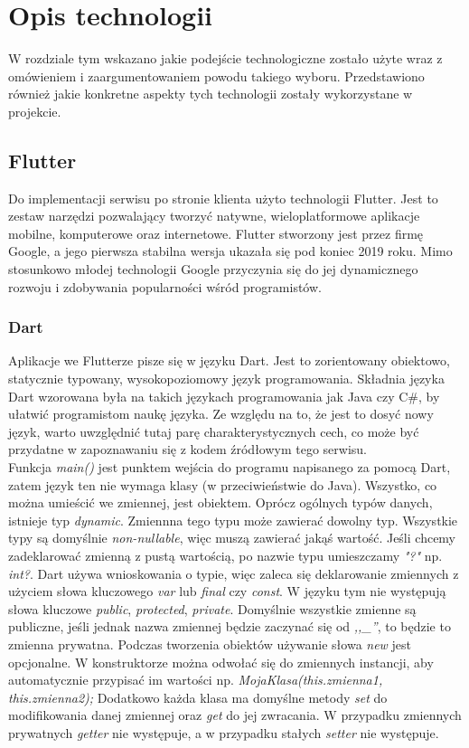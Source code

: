\chapter{Opis technologii}
\thispagestyle{chapterBeginStyle}

W rozdziale tym wskazano jakie podejście technologiczne zostało użyte wraz z omówieniem i zaargumentowaniem powodu takiego wyboru. Przedstawiono również jakie konkretne aspekty tych technologii zostały wykorzystane w projekcie.

\section{Flutter}

Do implementacji serwisu po stronie klienta użyto technologii Flutter. Jest to zestaw narzędzi pozwalający tworzyć natywne, wieloplatformowe aplikacje mobilne, komputerowe oraz internetowe. Flutter stworzony jest przez firmę Google, a jego pierwsza stabilna wersja ukazała się pod koniec 2019 roku. Mimo stosunkowo młodej technologii Google przyczynia się do jej dynamicznego rozwoju i zdobywania popularności wśród programistów. 

\subsection{Dart}

Aplikacje we Flutterze pisze się w języku Dart. Jest to zorientowany obiektowo, statycznie typowany, wysokopoziomowy język programowania. Składnia języka Dart wzorowana była na takich językach programowania jak Java czy C\#, by ułatwić programistom naukę języka. Ze względu na to, że jest to dosyć nowy język, warto uwzględnić tutaj parę charakterystycznych cech, co może być przydatne w zapoznawaniu się z kodem źródłowym tego serwisu. \\

Funkcja \emph{main()} jest punktem wejścia do programu napisanego za pomocą Dart, zatem język ten nie wymaga klasy (w przeciwieństwie do Java). Wszystko, co można umieścić we zmiennej, jest obiektem. Oprócz ogólnych typów danych, istnieje typ \emph{dynamic}. Zmiennna tego typu może zawierać dowolny typ. Wszystkie typy są domyślnie \emph{non-nullable}, więc muszą zawierać jakąś wartość. Jeśli chcemy zadeklarować zmienną z pustą wartością, po nazwie typu umieszczamy \emph{"?"} np. \emph{int?}. Dart używa wnioskowania o typie, więc zaleca się deklarowanie zmiennych z użyciem słowa kluczowego \emph{var} lub \emph{final} czy \emph{const}. W języku tym nie występują słowa kluczowe \emph{public}, \emph{protected}, \emph{private}. Domyślnie wszystkie zmienne są publiczne, jeśli jednak nazwa zmiennej będzie zaczynać się od \emph{,,\_''}, to będzie to zmienna prywatna. Podczas tworzenia obiektów używanie słowa \emph{new} jest opcjonalne. W konstruktorze można odwołać się do zmiennych instancji, aby automatycznie przypisać im wartości np. \emph{MojaKlasa(this.zmienna1, this.zmienna2);} Dodatkowo każda klasa ma domyślne metody \emph{set} do modifikowania danej zmiennej oraz \emph{get} do jej zwracania. W przypadku zmiennych prywatnych \emph{getter} nie występuje, a w przypadku stałych \emph{setter} nie występuje. \\

